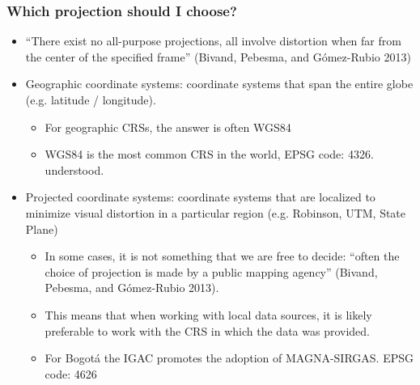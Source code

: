 \documentclass[
  shownotes,
  xcolor={svgnames},
  hyperref={colorlinks,citecolor=DarkBlue,linkcolor=DarkRed,urlcolor=DarkBlue}
  ]{beamer}
\begin{document}
\begin{frame}[fragile]
\frametitle{Which projection should I choose?}

\begin{itemize}
\small
\item “There exist no all-purpose projections, all involve distortion when far from the center of the specified frame” (Bivand, Pebesma, and Gómez-Rubio 2013)
\medskip
   \item  Geographic coordinate systems: coordinate systems that span the entire globe (e.g. latitude / longitude).
   \begin{itemize}
   	\footnotesize
    \item For geographic CRSs, the answer is often WGS84
    \item WGS84 is the most common CRS in the world,  EPSG code: 4326. understood.
   \end{itemize}
   \medskip
   \item  Projected coordinate systems: coordinate systems that are localized to minimize visual distortion in a particular region (e.g. Robinson, UTM, State Plane)
\begin{itemize}
	\footnotesize
    \item In some cases, it is not something that we are free to decide: “often the choice of projection is made by a public mapping agency” (Bivand, Pebesma, and Gómez-Rubio 2013).
    \item  This means that when working with local data sources, it is likely preferable to work with the CRS in which the data was provided.
    \item For Bogotá the IGAC promotes the adoption of MAGNA-SIRGAS. EPSG code: 4626
    \end{itemize}




\end{itemize}
\end{frame}
\end{document}
